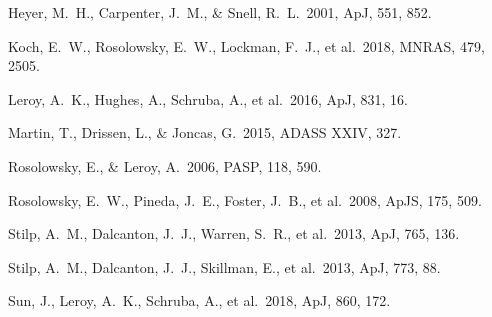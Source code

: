 \documentclass{rnaastex}
\begin{document}
\begin{thebibliography}{}


 Heyer, M.~H., Carpenter, J.~M., \& Snell, R.~L.\ 2001, ApJ, 551, 852.


 Koch, E.~W., Rosolowsky, E.~W., Lockman, F.~J., et al.\ 2018, MNRAS, 479, 2505.

 Leroy, A.~K., Hughes, A., Schruba, A., et al.\ 2016, ApJ, 831, 16.

 Martin, T., Drissen, L., \& Joncas, G.\ 2015, ADASS XXIV, 327.

 Rosolowsky, E., \& Leroy, A.\ 2006, PASP, 118, 590.

 Rosolowsky, E.~W., Pineda, J.~E., Foster, J.~B., et al.\ 2008, ApJS, 175, 509.

 Stilp, A.~M., Dalcanton, J.~J., Warren, S.~R., et al.\ 2013, ApJ, 765, 136.

 Stilp, A.~M., Dalcanton, J.~J., Skillman, E., et al.\ 2013, ApJ, 773, 88.

 Sun, J., Leroy, A.~K., Schruba, A., et al.\ 2018, ApJ, 860, 172.


\end{thebibliography}
\end{document}
